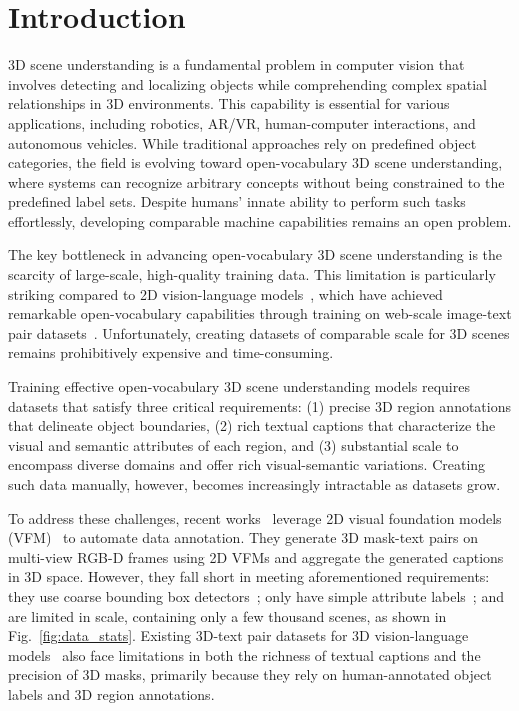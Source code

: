 \section{Introduction}
\label{sec:intro}


3D scene understanding is a fundamental problem in computer vision that involves detecting and localizing objects while comprehending complex spatial relationships in 3D environments.
This capability is essential for various applications, including robotics, AR/VR, human-computer interactions, and autonomous vehicles.
While traditional approaches rely on predefined object categories, the field is evolving toward open-vocabulary 3D scene understanding, where systems can recognize arbitrary concepts without being constrained to the predefined label sets.
Despite humans' innate ability to perform such tasks effortlessly, developing comparable machine capabilities remains an open problem.

The key bottleneck in advancing open-vocabulary 3D scene understanding is the scarcity of large-scale, high-quality training data.
This limitation is particularly striking compared to 2D vision-language models~\cite{radfordLearningTransferableVisual2021,hu2022scaling,li2022language,ghiasi2022scaling,zhai2023sigmoid,li2024if,liBLIPBootstrappingLanguageImage2022,liBLIP2BootstrappingLanguageImage2023,guopen,liang2023open,rao2022denseclip,shafiullahclip,xu2022groupvit}, 
which have achieved remarkable open-vocabulary capabilities through training on web-scale image-text pair datasets~\cite{radfordLearningTransferableVisual2021,schuhmann2022laion,kakaobrain2022coyo-700m,chenpali,gadre2024datacomp}. 
Unfortunately, creating datasets of comparable scale for 3D scenes remains prohibitively expensive and time-consuming.

Training effective open-vocabulary 3D scene understanding models requires datasets that satisfy three critical requirements:
(1) precise 3D region annotations that delineate object boundaries,
(2) rich textual captions that characterize the visual and semantic attributes of each region, and
(3) substantial scale to encompass diverse domains and offer rich visual-semantic variations.
Creating such data manually, however, becomes increasingly intractable as datasets grow.

To address these challenges, recent works~\cite{ding2022pla,yang2024regionplc,jiang2024open} leverage 2D visual foundation models (VFM)~\cite{llava,vit-gpt2,peng2023kosmos,zou2024segment} to automate data annotation.
They generate 3D mask-text pairs on multi-view RGB-D frames using 2D VFMs and aggregate the generated captions in 3D space.
However, they fall short in meeting aforementioned requirements: 
they use coarse bounding box detectors~\cite{ding2022pla,yang2024regionplc}; 
only have simple attribute labels~\cite{jiang2024open}; and are limited in scale, containing only a few thousand scenes, as shown in Fig.~\ref{fig:data_stats}.
Existing 3D-text pair datasets for 3D vision-language models~\cite{jiaSceneVerseScaling3D2024,wangEmbodiedScanHolisticMultiModal2023,lyu2024mmscan} also face limitations in both the richness of textual captions and the precision of 3D masks, primarily because they rely on human-annotated object labels and 3D region annotations.


